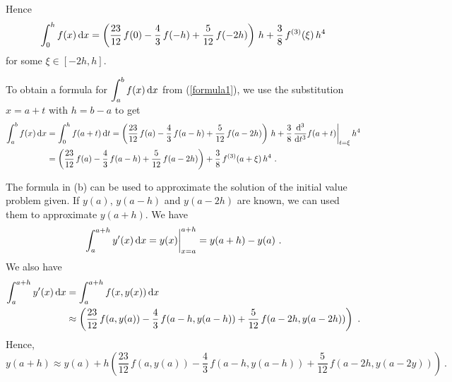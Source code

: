 {Hence
\begin{equation}\label{formula1}
\int_0^h f(x) \dx{x}
= \left(\frac{23}{12}\,f(0) - \frac{4}{3}\,f(-h) +
\frac{5}{12}\,f(-2h)\right)\,h + \frac{3}{8}\,f^{(3)}(\xi)\,h^4
\end{equation}
for some $\xi \in [-2h,h]$.

 To obtain a formula for $\displaystyle \int_a^b f(x)\dx{x}$ from
(\ref{formula1}), we use the substitution $x= a + t$ with $h=b-a$ to get
\begin{align*}
\int_a^b f(x)\dx{x} &= \int_0^h f(a+t) \dx{t}
= \left(\frac{23}{12}\,f(a) - \frac{4}{3}\,f(a-h) +
\frac{5}{12}\,f(a-2h)\right)\,h
+ \frac{3}{8}\,\dfdxn{f(a+t)}{t}{3}\bigg|_{t=\xi} \, h^4 \\
&= \left(\frac{23}{12}\,f(a) - \frac{4}{3}\,f(a-h) +
\frac{5}{12}\,f(a-2h)\right)
+\frac{3}{8}\,f^{(3)}(a+\xi)\,h^4 \ .
\end{align*}

 The formula in (b) can be used to approximate the solution of
the initial value problem given.  If $y(a)$, $y(a-h)$ and
$y(a-2h)$ are known, we can used them to approximate $y(a+h)$.
We have
\[
\int_{a}^{a+h} y'(x) \dx{x} = y(x)\bigg|_{x=a}^{a+h}
= y(a+h) - y(a) \ .
\]
We also have
\begin{align*}
\int_{a}^{a+h} y'(x) \dx{x} &= \int_{a}^{a+h} f(x,y(x)) \dx{x} \\
&\approx \left(\frac{23}{12}\,f(a,y(a)) - \frac{4}{3}\,f(a-h,y(a-h)) +
\frac{5}{12}\,f(a-2h,y(a-2h))\right) \ .
\end{align*}
Hence,
\[
y(a+h) \approx y(a) + h\left(\frac{23}{12}\,f(a,y(a)) -
  \frac{4}{3}\,f(a-h,y(a-h)) + \frac{5}{12}\,f(a-2h,y(a-2y))\right) \ .
\]
}

